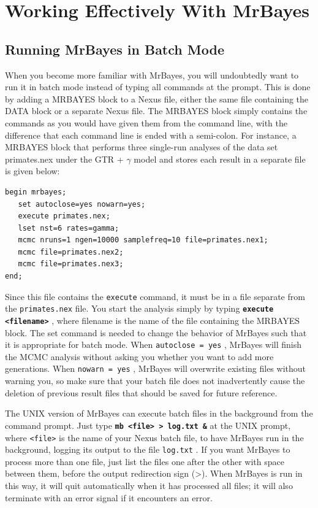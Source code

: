 \documentclass[12pt]{book}
\newcommand{\ttt}[1]{\texttt{#1} }
\newcommand{\tb}[1]{\texttt{\textbf{#1}} }
\begin{document}
\section{Working Effectively With MrBayes}

\subsection{Running MrBayes in Batch Mode}

When you become more familiar with MrBayes, you will undoubtedly want to run it in
batch mode instead of typing all commands at the prompt. This is done by adding a
MRBAYES block to a Nexus file, either the same file containing the DATA block or a
separate Nexus file. The MRBAYES block simply contains the commands as you would
have given them from the command line, with the difference that each command line is
ended with a semi-colon. For instance, a MRBAYES block that performs three single-run
analyses of the data set primates.nex under the GTR + $\gamma$  model and stores each result in a
separate file is given below:

\begin{singlespacing}
\small
\begin{verbatim}
begin mrbayes;
   set autoclose=yes nowarn=yes;
   execute primates.nex;
   lset nst=6 rates=gamma;
   mcmc nruns=1 ngen=10000 samplefreq=10 file=primates.nex1;
   mcmc file=primates.nex2;
   mcmc file=primates.nex3;
end;
\end{verbatim}
\normalsize
\end{singlespacing}

Since this file contains the \ttt{execute} command, it must be in a file separate from the
\ttt{primates.nex} file. You start the analysis simply by typing \tb{execute
<filename>}, where filename is the name of the file containing the MRBAYES block.
The set command is needed to change the behavior of MrBayes such that it is
appropriate for batch mode. When \ttt{autoclose = yes}, MrBayes will finish the
MCMC analysis without asking you whether you want to add more generations. When
\ttt{nowarn = yes}, MrBayes will overwrite existing files without warning you, so make
sure that your batch file does not inadvertently cause the deletion of previous result files
that should be saved for future reference.

The UNIX version of MrBayes can execute batch files in the background from the
command prompt. Just type \tb{mb <file> > log.txt \&} at the UNIX prompt, where
\ttt{<file>} is the name of your Nexus batch file, to have MrBayes run in the background,
logging its output to the file \ttt{log.txt}. If you want MrBayes to process more than one
file, just list the files one after the other with space between them, before the output
redirection sign (>). When MrBayes is run in this way, it will quit automatically when it
has processed all files; it will also terminate with an error signal if it encounters an error.
\end{document}
